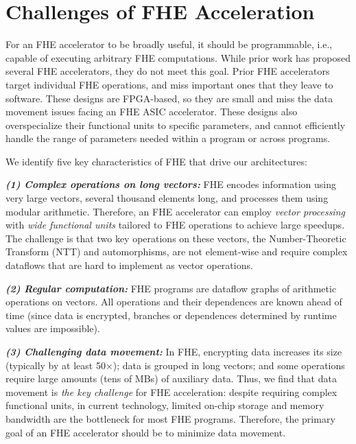 \section{Challenges of FHE Acceleration}
\label{sec:general}

For an FHE accelerator to be broadly useful, it should be programmable, i.e.,
capable of executing arbitrary FHE computations. While prior work has proposed
several FHE accelerators, they do not meet this goal. Prior FHE
accelerators~\cite{cousins:hpec14:fpga-he,cousins:tetc17:fpga-he,doroz:tc15:accelerating-fhe,roy:hpca19:fpga-he,riazi:asplos20:heax,turan:tc20:heaws}
target individual FHE operations, and miss important ones that they leave to
software. These designs are FPGA-based, so they are small and miss the data
movement issues facing an FHE ASIC accelerator. These designs also
overspecialize their functional units to specific parameters, and cannot
efficiently handle the range of parameters needed within a program or across
programs.

We identify five key characteristics of FHE that drive our architectures:

\noindent \textbf{\emph{(1) Complex operations on long vectors:}}
FHE encodes information using very large vectors, several thousand elements
long, and processes them using modular arithmetic. Therefore, an FHE
accelerator can employ \emph{vector processing} with \emph{wide functional
units} tailored to FHE operations to achieve large speedups. The challenge is
that two key operations on these vectors, the Number-Theoretic Transform (NTT)
and automorphisms, are not element-wise and require complex dataflows that are
hard to implement as vector operations.

\noindent \textbf{\emph{(2) Regular computation:}}
FHE programs are dataflow graphs of arithmetic operations on vectors. All
operations and their dependences are known ahead of time (since data is
encrypted, branches or dependences determined by runtime values are
impossible).

\noindent \textbf{\emph{(3) Challenging data movement:}}
In FHE, encrypting data increases its size (typically by at least 50$\times$);
data is grouped in long vectors; and some operations require large amounts
(tens of MBs) of auxiliary data. Thus, we find that data movement is \emph{the
key challenge} for FHE acceleration: despite requiring complex functional
units, in current technology, limited on-chip storage and memory bandwidth are
the bottleneck for most FHE programs. Therefore, the primary goal of an FHE
accelerator should be to minimize data movement.

